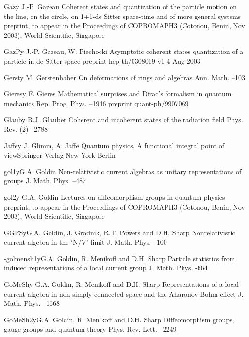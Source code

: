 \documentclass[12pt]{amsart}
\numberwithin{equation}{section}
\theoremstyle{remark}
\newcommand{\by}{\mathbf y}
\begin{document}
\begin{thebibliography}{199}
 Gaz\by{ J.-P. Gazeau \paper Coherent states and  quantization of the
particle motion on the line, on the circle, on 1+1-de Sitter space-time and of
more general systems \paperinfo preprint, to appear in the Proceedings of
COPROMAPH3 (Cotonou, Benin, Nov 2003), World Scientific, Singapore}

 GazP\by{ J.-P. Gazeau, W. Piechocki \paper Asymptotic coherent states
quantization of a particle in de Sitter space \paperinfo preprint
hep-th/0308019 v1 4 Aug 2003}

 Gerst\by{ M. Gerstenhaber \paper On deformations of rings and algebras
\jour Ann. Math.   --103}

 Gieres\by{ F. Gieres \paper Mathematical surprises and Dirac's formalism
in quantum mechanics \jour Rep. Prog. Phys.   --1946
\paperinfo preprint quant-ph/9907069}

 Glaub\by{ R.J. Glauber \paper Coherent and incoherent states of the
radiation field \jour Phys. Rev. (2)   --2788}

 Jaffe\by{ J. Glimm, A. Jaffe \book Quantum physics. A functional
integral point of view\publ Springer-Verlag \publaddr New York-Berlin}

 gol1\by{G.A. Goldin \paper Non-relativistic current algebras as unitary representations of
groups \jour J. Math. Phys.   --487}

 gol2\by{ G.A. Goldin \paper Lectures on diffeomorphism groups in
quantum physics \paperinfo preprint, to appear in the Proceedings of
COPROMAPH3 (Cotonou, Benin, Nov 2003), World Scientific, Singapore}

 GGPS\by{G.A. Goldin, J. Grodnik, R.T. Powers and D.H. Sharp
\paper Nonrelativistic current algebra in the `N/V' limit
\jour J. Math. Phys.   --100}

 -golmensh1\by{G.A. Goldin, R. Menikoff and D.H. Sharp \paper Particle
statistics from induced representations of a local current group \jour J. Math.
Phys.   -664}

 GoMeSh\by{ G.A. Goldin, R. Menikoff and D.H. Sharp \paper Representations of
a local current algebra in  non-simply connected space and the Aharonov-Bohm
effect \jour J. Math. Phys.   --1668}

 GoMeSh2\by{G.A. Goldin, R. Menikoff and D.H. Sharp \paper Diffeomorphism groups,
gauge groups and quantum theory \jour Phys. Rev. Lett.   --2249}



\end{thebibliography}
\end{document}

